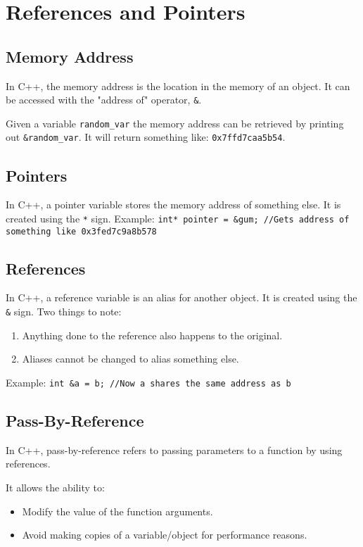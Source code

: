 \chapter{References and Pointers}
\section{Memory Address}
In C++, the memory address is the location in the memory of an object. It can be accessed with the "address of" operator, \verb!&!.

Given a variable \verb!random_var! the memory address can be retrieved 
by printing out \verb!&random_var!. It will return something like: \verb!0x7ffd7caa5b54!.

\section{Pointers}
In C++, a pointer variable stores the memory address of something else.  
It is created using the \verb!*! sign.  
Example: \verb!int* pointer = &gum; //Gets address of something like 0x3fed7c9a8b578!

\section{References} 
In C++, a reference variable is an alias for another object. It is created using the \verb!&! sign. Two things to note:

\begin{enumerate}
    \item Anything done to the reference also happens to the original.
    \item Aliases cannot be changed to alias something else.
\end{enumerate}

Example: \verb!int &a = b; //Now a shares the same address as b!
\newpage
\section{Pass-By-Reference}
In C++, pass-by-reference refers to passing parameters to a function by using references.  

It allows the ability to:  

\begin{itemize}
    \item Modify the value of the function arguments.
    \item Avoid making copies of a variable/object for performance reasons.
\end{itemize}

